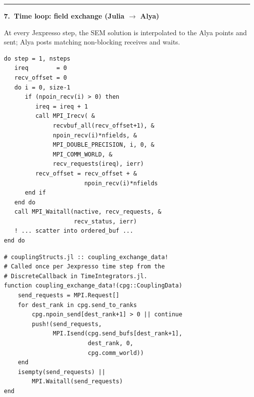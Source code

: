 \documentclass[10pt,landscape]{article}
\newlength{\stepW}\setlength{\stepW}{3.0cm}
\newlength{\codeW}\setlength{\codeW}{10.6cm}
\newcommand{\stepHdr}[1]{%
  \par\medskip
  \noindent\textcolor{ruleC}{\rule{\linewidth}{0.3pt}}\par
  \noindent\textbf{#1}\par\smallskip
}
\begin{document}
\stepHdr{7.\ Time loop: field exchange (Julia $\rightarrow$ Alya)}
\noindent
\begin{minipage}[t]{\stepW}
\footnotesize At every Jexpresso step, the SEM solution is interpolated to the Alya points and sent; Alya posts matching non-blocking receives and waits.
\end{minipage}\hfill
\begin{minipage}[t]{\codeW}
\begin{lstlisting}[style=fortran]
do step = 1, nsteps
   ireq        = 0
   recv_offset = 0
   do i = 0, size-1
      if (npoin_recv(i) > 0) then
         ireq = ireq + 1
         call MPI_Irecv( &
              recvbuf_all(recv_offset+1), &
              npoin_recv(i)*nfields, &
              MPI_DOUBLE_PRECISION, i, 0, &
              MPI_COMM_WORLD, &
              recv_requests(ireq), ierr)
         recv_offset = recv_offset + &
                       npoin_recv(i)*nfields
      end if
   end do
   call MPI_Waitall(nactive, recv_requests, &
                    recv_status, ierr)
   ! ... scatter into ordered_buf ...
end do
\end{lstlisting}
\end{minipage}\hfill
\begin{minipage}[t]{\codeW}
\begin{lstlisting}[style=julia]
# couplingStructs.jl :: coupling_exchange_data!
# Called once per Jexpresso time step from the
# DiscreteCallback in TimeIntegrators.jl.
function coupling_exchange_data!(cpg::CouplingData)
    send_requests = MPI.Request[]
    for dest_rank in cpg.send_to_ranks
        cpg.npoin_send[dest_rank+1] > 0 || continue
        push!(send_requests,
              MPI.Isend(cpg.send_bufs[dest_rank+1],
                        dest_rank, 0,
                        cpg.comm_world))
    end
    isempty(send_requests) ||
        MPI.Waitall(send_requests)
end
\end{lstlisting}
\end{minipage}
\end{document}
